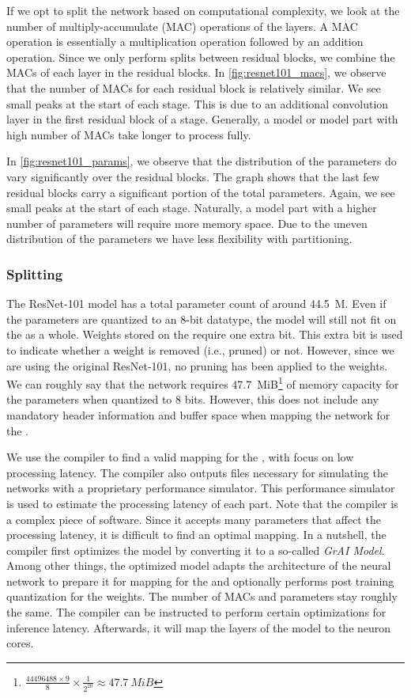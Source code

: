 If we opt to split the network based on computational complexity, we look at the number of multiply-accumulate (MAC) operations of the layers.
A MAC operation is essentially a multiplication operation followed by an addition operation.
Since we only perform splits between residual blocks, we combine the MACs of each layer in the residual blocks.
In \cref{fig:resnet101_macs}, we observe that the number of MACs for each residual block is relatively similar.
We see small peaks at the start of each stage.
This is due to an additional convolution layer in the first residual block of a stage.
Generally, a model or model part with high number of MACs take longer to process fully.

In \cref{fig:resnet101_params}, we observe that the distribution of the parameters do vary significantly over the residual blocks.
The graph shows that the last few residual blocks carry a significant portion of the total parameters.
Again, we see small peaks at the start of each stage.
Naturally, a model part with a higher number of parameters will require more memory space.
Due to the uneven distribution of the parameters we have less flexibility with partitioning. 

\subsubsection{Splitting}
The ResNet-101 model has a total parameter count of around \SI{44.5}{M}.
Even if the parameters are quantized to an 8-bit datatype, the model will still not fit on the \graicore{} as a whole.
Weights stored on the \graicore{} require one extra bit.
This extra bit is used to indicate whether a weight is removed (i.e., pruned) or not.
However, since we are using the original ResNet-101, no pruning has been applied to the weights.
We can roughly say that the network requires \SI{47.7}{MiB}\footnote{$\frac{\num{44496488} \times 9}{8} \times \frac{1}{2^{20}} \approx \SI{47.7}{MiB}$} of memory capacity for the parameters when quantized to 8 bits.
However, this does not include any mandatory header information and buffer space when mapping the network for the \graicore{}. 

We use the compiler to find a valid mapping for the \graicore{}, with focus on low processing latency.
The compiler also outputs files necessary for simulating the networks with a proprietary performance simulator.
This performance simulator is used to estimate the processing latency of each part.
Note that the compiler is a complex piece of software.
Since it accepts many parameters that affect the processing latency, it is difficult to find an optimal mapping. 
In a nutshell, the compiler first optimizes the model by converting it to a so-called \textit{GrAI Model}.
Among other things, the optimized model adapts the architecture of the neural network to prepare it for mapping for the \graicore{} and optionally performs post training quantization \autocite{krishnamoorthiQuantizingDeepConvolutional2018} for the weights.
The number of MACs and parameters stay roughly the same.
The compiler can be instructed to perform certain optimizations for inference latency.
Afterwards, it will map the layers of the model to the neuron cores.

